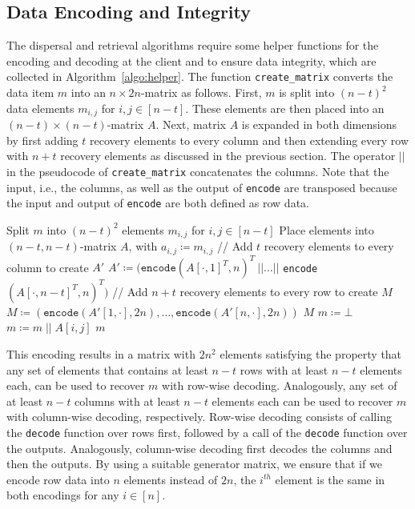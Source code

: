 \documentclass[sigconf,screen]{acmart}
\begin{document}
\subsection{Data Encoding and Integrity}
The dispersal and retrieval algorithms require some helper functions for the encoding and decoding at the client and to ensure data integrity, which are collected in Algorithm~\ref{algo:helper}.
The function \texttt{create\_matrix} converts the data item $m$ into an $n \times 2n$-matrix as follows. First, $m$ is split into $(n-t)^2$ data elements $m_{i,j}$ for $i,j \in [n-t]$. These elements are then placed into an $(n-t) \times (n-t)$-matrix $A$.
Next, matrix $A$ is expanded in both dimensions by first adding $t$ recovery elements to every column and then extending every row with $n+t$ recovery elements as discussed in the previous section.
The operator $||$ in the pseudocode of \texttt{create\_matrix} concatenates the columns. Note that the input, i.e., the columns, as well as the output of \texttt{encode} are transposed because the input and output of \texttt{encode} are both defined as row data.

\begin{algorithm}[t]
\begin{algorithmic}[1]
\small
\caption{Client helper functions.}
    \label{algo:helper}
\State Split $m$ into $(n-t)^2$ elements $m_{i,j}$ for $i,j \in [n-t]$
\State Place elements into $(n-t,n-t)$-matrix $A$, with $a_{i,j}  \coloneqq m_{i,j}$
\State // Add $t$ recovery elements to every column to create $A'$
\State $A' \coloneqq (\texttt{encode}(A[\cdot, 1]^T,n)^T ~||\ldots ||$ \texttt{encode}$(A[\cdot, n-t]^T,n)^T)$
\State // Add $n+t$ recovery elements to every row to create $M$
\State $M \coloneqq (\texttt{encode}(A'[1,\cdot],2n), \ldots,  \texttt{encode}(A'[n,\cdot],2n))$
\State \Return $M$
\EndFunction
\vspace{0.1cm}
{}
\State $m \coloneqq \bot$
\State $m \coloneqq m \;||\; A[i,j]$
\EndFor
\EndFor
\State \Return $m$
\EndFunction
\end{algorithmic}
\end{algorithm}

This encoding results in a matrix with $2n^2$ elements satisfying the property that any set of elements that contains at least $n-t$ rows with at least $n-t$ elements each, can be used to recover $m$ with row-wise decoding. 
Analogously, any set of at least $n-t$ columns with at least $n-t$ elements each can be used to recover $m$ with column-wise decoding, respectively.
Row-wise decoding consists of calling the \texttt{decode} function over rows first, followed by a call of the \texttt{decode} function over the outputs.
Analogously, column-wise decoding first decodes the columns and then the outputs.
By using a suitable generator matrix, we ensure that if we encode row data into $n$ elements instead of $2n$, the $i^\mathit{th}$ element is the same in both encodings for any $i \in [n]$.
\end{document}
